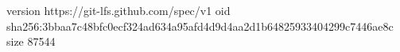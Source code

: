 version https://git-lfs.github.com/spec/v1
oid sha256:3bbaa7c48bfc0ecf324ad634a95afd4d9d4aa2d1b64825933404299c7446ae8c
size 87544
